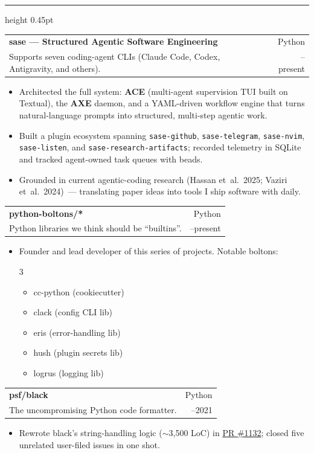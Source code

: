 \documentclass[letterpaper,10pt]{article}
\makeatletter
\newcommand{\resheading}[1]{%
  \par\addvspace{10pt}%
  \noindent
  {\bfseries\color{googleblue}\fontsize{10pt}{12pt}\selectfont%
   \textls*[90]{\MakeUppercase{#1}}}%
  \hspace{0.65em}%
  {\color{googleline}\leaders\hrule height 0.45pt\hfill\kern0pt}%
  \par\nobreak\addvspace{3pt}%
}
\newcommand{\projsubheading}[4]{%
  \par\addvspace{3pt}%
  \noindent
  \begin{tabular*}{\textwidth}{@{}l@{\extracolsep{\fill}}r@{}}
    {\bfseries\color{googleink}\fontsize{10.4pt}{12.4pt}\selectfont #1} &
    {\ttfamily\color{googleslate}\fontsize{8.6pt}{10.3pt}\selectfont #2} \\[0.5pt]
    {\color{googleink}\fontsize{9.9pt}{11.7pt}\selectfont #3} &
    {\color{googleslate}\fontsize{8.8pt}{10.5pt}\selectfont #4}
  \end{tabular*}\par\vspace{-3pt}
}
\makeatother
\begin{document}
\resheading{Selected Projects}

\projsubheading{sase --- Structured Agentic Software Engineering}{Python}{Supports seven coding-agent CLIs (Claude Code, Codex, Antigravity, and others).}{2025--present}
\begin{itemize}
  \item Architected the full system: \textbf{ACE} (multi-agent supervision TUI built on Textual), the \textbf{AXE} daemon, and a YAML-driven workflow engine that turns natural-language prompts into structured, multi-step agentic work.
  \item Built a plugin ecosystem spanning \texttt{sase-github}, \texttt{sase-telegram}, \texttt{sase-nvim}, \texttt{sase-listen}, and \texttt{sase-research-artifacts}; recorded telemetry in SQLite and tracked agent-owned task queues with beads.
  \item Grounded in current agentic-coding research (Hassan et~al.\ 2025; Vaziri et~al.\ 2024)~--- translating paper ideas into tools I ship software with daily.
\end{itemize}

\projsubheading{python-boltons/*}{Python}{Python libraries we think should be ``builtins''.}{2021--present}
\begin{itemize}
  \item Founder and lead developer of this series of projects. Notable boltons:
  \vspace{-0.34cm}
  \begin{multicols}{3}
    \begin{itemize}
      \item cc-python (cookiecutter)
      \item clack (config CLI lib)
      \item eris (error-handling lib)
      \item hush (plugin secrets lib)
      \item logrus (logging lib)
    \end{itemize}
  \end{multicols}
  \vspace{-0.36cm}
\end{itemize}

\projsubheading{psf/black}{Python}{The uncompromising Python code formatter.}{2019--2021}
\begin{itemize}
  \item Rewrote black's string-handling logic ($\sim$3{,}500 LoC) in \href{https://github.com/psf/black/pull/1132}{PR \#1132}; closed five unrelated user-filed issues in one shot.
\end{itemize}
\end{document}
